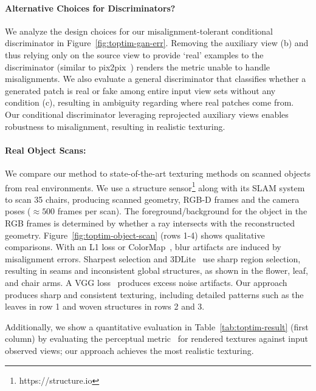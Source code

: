 \paragraph*{Alternative Choices for Discriminators?} 
We analyze the design choices for our misalignment-tolerant conditional discriminator in Figure~\ref{fig:toptim-gan-err}.
Removing the auxiliary view (b) and thus relying only on the source view to provide `real' examples to the discriminator (similar to pix2pix~\cite{isola2017image}) renders the metric unable to handle misalignments.
We also evaluate a  general discriminator that classifies whether a generated patch is real or fake among entire input view sets without any condition (c), resulting in ambiguity regarding where real patches come from. 
Our conditional discriminator leveraging reprojected auxiliary views enables robustness to misalignment, resulting in realistic texturing.

\paragraph*{Real Object Scans:}
We compare our method to state-of-the-art texturing methods on scanned objects from real environments. We use a structure sensor\footnote{https://structure.io} along with its SLAM system to scan 35 chairs, producing scanned geometry, RGB-D frames and the camera poses ($\approx 500$ frames per scan). 
The foreground/background for the object in the RGB frames is determined by whether a ray intersects with the reconstructed geometry. Figure~\ref{fig:toptim-object-scan} (rows 1-4) shows qualitative comparisons.
With an L1 loss or ColorMap~\cite{zhou2014color}, blur artifacts are induced by misalignment errors.
Sharpest selection and 3DLite~\cite{huang20173dlite} use sharp region selection, resulting in seams and inconsistent global structures, as shown in the flower, leaf, and chair arms. 
A VGG loss~\cite{johnson2016perceptual} produces excess noise artifacts.  
Our approach produces sharp and consistent texturing, including detailed patterns such as the leaves in row 1 and woven structures in rows 2 and 3.

Additionally, we show a quantitative evaluation in Table~\ref{tab:toptim-result} (first column) by evaluating the perceptual metric~\cite{zhang2018unreasonable} for rendered textures against input observed views; our approach achieves the most realistic texturing.

